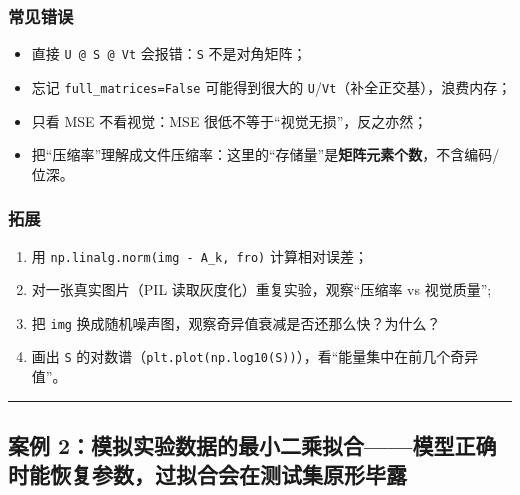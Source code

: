 \subsubsection{常见错误}\label{ux5e38ux89c1ux9519ux8bef-9}

\begin{itemize}
\tightlist
\item
  直接 \texttt{U\ @\ S\ @\ Vt} 会报错：\texttt{S} 不是对角矩阵；
\item
  忘记 \texttt{full\_matrices=False} 可能得到很大的
  \texttt{U}/\texttt{Vt}（补全正交基），浪费内存；
\item
  只看 MSE 不看视觉：MSE 很低不等于``视觉无损''，反之亦然；
\item
  把``压缩率''理解成文件压缩率：这里的``存储量''是\textbf{矩阵元素个数}，不含编码/位深。
\end{itemize}

\subsubsection{拓展}\label{ux62d3ux5c55-9}

\begin{enumerate}
\def\labelenumi{\arabic{enumi}.}
\tightlist
\item
  用
  \texttt{np.linalg.norm(img\ -\ A\_k,\ \textquotesingle{}fro\textquotesingle{})}
  计算相对误差；
\item
  对一张真实图片（PIL 读取灰度化）重复实验，观察``压缩率 vs 视觉质量'';
\item
  把 \texttt{img} 换成随机噪声图，观察奇异值衰减是否还那么快？为什么？
\item
  画出 \texttt{S}
  的对数谱（\texttt{plt.plot(np.log10(S))}），看``能量集中在前几个奇异值''。
\end{enumerate}

\begin{center}\rule{0.5\linewidth}{0.5pt}\end{center}

\subsection{案例
2：模拟实验数据的最小二乘拟合------模型正确时能恢复参数，过拟合会在测试集原形毕露}\label{ux6848ux4f8b-2ux6a21ux62dfux5b9eux9a8cux6570ux636eux7684ux6700ux5c0fux4e8cux4e58ux62dfux5408ux6a21ux578bux6b63ux786eux65f6ux80fdux6062ux590dux53c2ux6570ux8fc7ux62dfux5408ux4f1aux5728ux6d4bux8bd5ux96c6ux539fux5f62ux6bd5ux9732}

